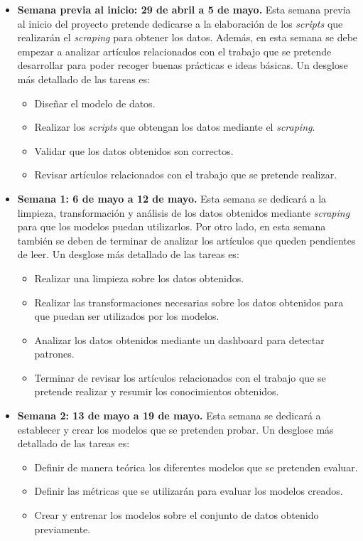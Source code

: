 \begin{itemize}
  \item \textbf{Semana previa al inicio: 29 de abril a 5 de mayo.}
  Esta semana previa al inicio del proyecto pretende dedicarse a la elaboración de los \textit{scripts} que realizarán el \textit{scraping} para obtener los datos. Además, en esta semana se debe empezar a analizar artículos relacionados con el trabajo que se pretende desarrollar para poder recoger buenas prácticas e ideas básicas. Un desglose más detallado de las tareas es:
  \begin{itemize}
    \item Diseñar el modelo de datos.
    \item Realizar los \textit{scripts} que obtengan los datos mediante el \textit{scraping}.
    \item Validar que los datos obtenidos son correctos.
    \item Revisar artículos relacionados con el trabajo que se pretende realizar.
  \end{itemize}

  \item \textbf{Semana 1: 6 de mayo a 12 de mayo.}
  Esta semana se dedicará a la limpieza, transformación y análisis de los datos obtenidos mediante \textit{scraping} para que los modelos puedan utilizarlos. Por otro lado, en esta semana también se deben de terminar de analizar los artículos que queden pendientes de leer. Un desglose más detallado de las tareas es:
  \begin{itemize}
    \item Realizar una limpieza sobre los datos obtenidos.
    \item Realizar las transformaciones necesarias sobre los datos obtenidos para que puedan ser utilizados por los modelos.
    \item Analizar los datos obtenidos mediante un dashboard para detectar patrones.
    \item Terminar de revisar los artículos relacionados con el trabajo que se pretende realizar y resumir los conocimientos obtenidos.
  \end{itemize}
  
  \item \textbf{Semana 2: 13 de mayo a 19 de mayo.}
  Esta semana se dedicará a establecer y crear los modelos que se pretenden probar. Un desglose más detallado de las tareas es:
  \begin{itemize}
    \item Definir de manera teórica los diferentes modelos que se pretenden evaluar.
    \item Definir las métricas que se utilizarán para evaluar los modelos creados.
    \item Crear y entrenar los modelos sobre el conjunto de datos obtenido previamente.
  \end{itemize}


\end{itemize}
